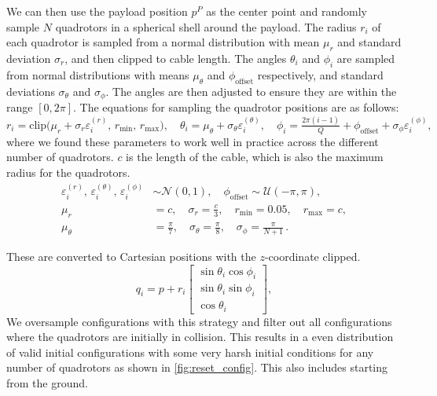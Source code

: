 We can then use the payload position $p^P$ as the center point and randomly sample $N$ quadrotors in a spherical shell around the payload. The radius $r_i$ of each quadrotor is sampled from a normal distribution with mean $\mu_r$ and standard deviation $\sigma_r$, and then clipped to cable length. The angles $\theta_i$ and $\phi_i$ are sampled from normal distributions with means $\mu_\theta$ and $\phi_{\mathrm{offset}}$ respectively, and standard deviations $\sigma_\theta$ and $\sigma_\phi$. The angles are then adjusted to ensure they are within the range $[0, 2\pi]$. The equations for sampling the quadrotor positions are as follows:
\begin{equation}
r_i = \mathrm{clip}\bigl(\mu_r+\sigma_r\varepsilon_i^{(r)},\,r_{\min},\,r_{\max}\bigr),\quad
\theta_i = \mu_\theta+\sigma_\theta\varepsilon_i^{(\theta)},\quad
\phi_i = \tfrac{2\pi(i-1)}{Q} + \phi_{\mathrm{offset}} + \sigma_\phi\varepsilon_i^{(\phi)},
\end{equation}
where we found these parameters to work well in practice across the different number of quadrotors. $c$ is the length of the cable, which is also the maximum radius for the quadrotors.
\begin{equation}
\begin{aligned}
\varepsilon_i^{(r)},\,\varepsilon_i^{(\theta)},\,\varepsilon_i^{(\phi)}
    &\sim \mathcal{N}(0,1), \quad
\phi_{\mathrm{offset}} \sim \mathcal{U}(-\pi,\pi),\\
\mu_r &= c,\quad
\sigma_r = \tfrac{c}{3},\quad
r_{\min} = 0.05,\quad
r_{\max} = c,\\
\mu_\theta &= \tfrac{\pi}{7},\quad
\sigma_\theta = \tfrac{\pi}{8},\quad
\sigma_\phi = \tfrac{\pi}{N+1}\,.
\end{aligned}
\end{equation}

These are converted to Cartesian positions with the $z$-coordinate clipped.
\begin{equation}
q_i = p + r_i
\begin{bmatrix}
\sin\theta_i\cos\phi_i\\
\sin\theta_i\sin\phi_i\\
\cos\theta_i
\end{bmatrix},
\end{equation}
We oversample configurations with this strategy and filter out all configurations where the quadrotors are initially in collision. This results in a even distribution of valid initial configurations with some very harsh initial conditions for any number of quadrotors as shown in \autoref{fig:reset_config}. This also includes starting from the ground. 

